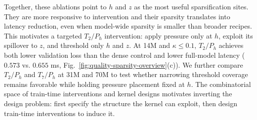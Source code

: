 Together, these ablations point to \(h\) and \(z\) as the most useful sparsification sites. They are more responsive to intervention and their sparsity translates into latency reduction, even when model-wide sparsity is smaller than broader recipes. This motivates a targeted \(T_2/P_h\) intervention: apply pressure only at \(h\), exploit its spillover to \(z\), and threshold only \(h\) and \(z\). At 14M and \(\kappa \leq 0.1\), \(T_2/P_h\) achieves both lower validation loss than the dense control and lower full-model latency (\(0.573\) vs. \(0.655\) ms, Fig.~\ref{fig:quality-sparsity-overview}(c)). We further compare $T_2/P_h$ and $T_7/P_h$ at 31M and 70M to test whether narrowing threshold coverage remains favorable while holding pressure placement fixed at $h$. The combinatorial space of train-time interventions and kernel designs motivates inverting the design problem: first specify the structure the kernel can exploit, then design train-time interventions to induce it.






